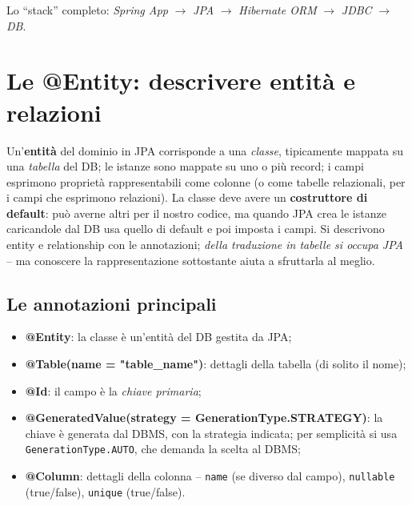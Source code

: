 Lo ``stack'' completo: \emph{Spring App} $\rightarrow$ \emph{JPA} $\rightarrow$
\emph{Hibernate ORM} $\rightarrow$ \emph{JDBC} $\rightarrow$ \emph{DB}.

\section{Le @Entity: descrivere entit\`a e relazioni}

\begin{definizione}[Entity]
Un'\textbf{entit\`a} del dominio in JPA corrisponde a una \emph{classe}, tipicamente mappata
su una \emph{tabella} del DB; le istanze sono mappate su uno o pi\`u record; i campi
esprimono propriet\`a rappresentabili come colonne (o come tabelle relazionali, per i campi
che esprimono relazioni). La classe deve avere un \textbf{costruttore di default}: pu\`o
averne altri per il nostro codice, ma quando JPA crea le istanze caricandole dal DB usa
quello di default e poi imposta i campi. Si descrivono entity e relationship con le
annotazioni; \emph{della traduzione in tabelle si occupa JPA} -- ma conoscere la
rappresentazione sottostante aiuta a sfruttarla al meglio.
\end{definizione}

\subsection{Le annotazioni principali}
\begin{itemize}
  \item \textbf{@Entity}: la classe \`e un'entit\`a del DB gestita da JPA;
  \item \textbf{@Table(name = "table\_name")}: dettagli della tabella (di solito il nome);
  \item \textbf{@Id}: il campo \`e la \emph{chiave primaria};
  \item \textbf{@GeneratedValue(strategy = GenerationType.STRATEGY)}: la chiave \`e generata
        dal DBMS, con la strategia indicata; per semplicit\`a si usa
        \texttt{GenerationType.AUTO}, che demanda la scelta al DBMS;
  \item \textbf{@Column}: dettagli della colonna -- \texttt{name} (se diverso dal campo),
        \texttt{nullable} (true/false), \texttt{unique} (true/false).
\end{itemize}

